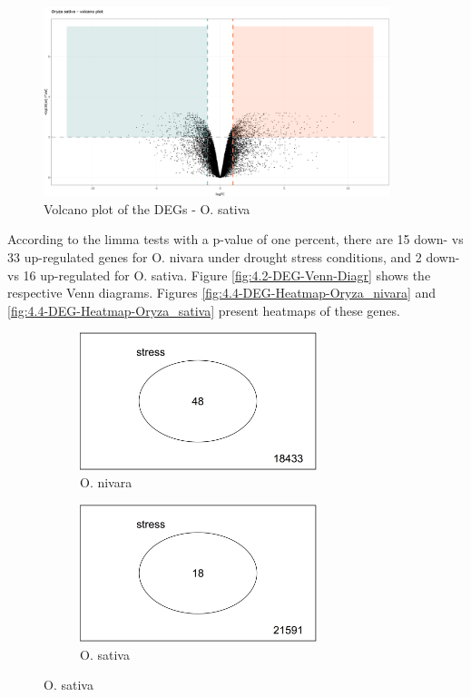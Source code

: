 \begin{figure}[htbp]
    \caption{Volcano plot of the DEGs - O. sativa}
    \label{fig:4.1-DEG-Volcano-Plot-Oryza_sativa}
    \includegraphics[width=0.9\textwidth]{../../results/plots-and-tables/4.1-DEG-Volcano-Plot-Oryza_sativa}
\end{figure}

According to the limma tests with a p-value of one percent, there are 15 down- vs 33 up-regulated genes for O. nivara under drought stress conditions, and 2 down- vs 16 up-regulated for O. sativa. Figure \ref{fig:4.2-DEG-Venn-Diagr} shows the respective Venn diagrams. Figures \ref{fig:4.4-DEG-Heatmap-Oryza_nivara} and \ref{fig:4.4-DEG-Heatmap-Oryza_sativa} present heatmaps of these genes.

\begin{figure}[htbp]
    \caption{Venn diagrams of the DEGs}
    \label{fig:4.2-DEG-Venn-Diagr}
    \begin{subfigure}[t]{0.44\linewidth}
        \caption{O. nivara}
        \label{fig:4.2-DEG-Venn-Diagr-Oryza_nivara}
        \includegraphics[width=\textwidth, height=4cm]{../../results/plots-and-tables/4.2-DEG-Venn-Diagr-Oryza_nivara}
    \end{subfigure}
    \begin{subfigure}[t]{0.44\linewidth}
        \caption{O. sativa}
        \label{fig:4.2-DEG-Venn-Diagr-Oryza_sativa}
        \includegraphics[width=\textwidth, height=4cm]{../../results/plots-and-tables/4.2-DEG-Venn-Diagr-Oryza_sativa}
    \end{subfigure}
\end{figure}

